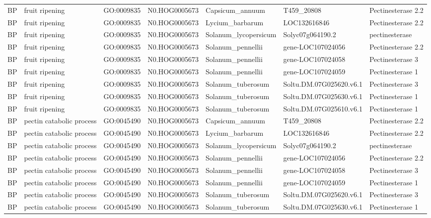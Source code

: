 \begin{table}
\begin{tabular}[t]{lllllll}
BP & fruit ripening & GO:0009835 & N0.HOG0005673 & Capsicum\_annuum & T459\_20808 & Pectinesterase 2.2\\
BP & fruit ripening & GO:0009835 & N0.HOG0005673 & Lycium\_barbarum & LOC132616846 & Pectinesterase 2.2\\
BP & fruit ripening & GO:0009835 & N0.HOG0005673 & Solanum\_lycopersicum & Solyc07g064190.2 & pectinesterase\\
BP & fruit ripening & GO:0009835 & N0.HOG0005673 & Solanum\_pennellii & gene-LOC107024056 & Pectinesterase 2.2\\
BP & fruit ripening & GO:0009835 & N0.HOG0005673 & Solanum\_pennellii & gene-LOC107024058 & Pectinesterase 3\\
BP & fruit ripening & GO:0009835 & N0.HOG0005673 & Solanum\_pennellii & gene-LOC107024059 & Pectinesterase 1\\
BP & fruit ripening & GO:0009835 & N0.HOG0005673 & Solanum\_tuberosum & Soltu.DM.07G025620.v6.1 & Pectinesterase 3\\
BP & fruit ripening & GO:0009835 & N0.HOG0005673 & Solanum\_tuberosum & Soltu.DM.07G025630.v6.1 & Pectinesterase 1\\
BP & fruit ripening & GO:0009835 & N0.HOG0005673 & Solanum\_tuberosum & Soltu.DM.07G025610.v6.1 & Pectinesterase 1\\
BP & pectin catabolic process & GO:0045490 & N0.HOG0005673 & Capsicum\_annuum & T459\_20808 & Pectinesterase 2.2\\
BP & pectin catabolic process & GO:0045490 & N0.HOG0005673 & Lycium\_barbarum & LOC132616846 & Pectinesterase 2.2\\
BP & pectin catabolic process & GO:0045490 & N0.HOG0005673 & Solanum\_lycopersicum & Solyc07g064190.2 & pectinesterase\\
BP & pectin catabolic process & GO:0045490 & N0.HOG0005673 & Solanum\_pennellii & gene-LOC107024056 & Pectinesterase 2.2\\
BP & pectin catabolic process & GO:0045490 & N0.HOG0005673 & Solanum\_pennellii & gene-LOC107024058 & Pectinesterase 3\\
BP & pectin catabolic process & GO:0045490 & N0.HOG0005673 & Solanum\_pennellii & gene-LOC107024059 & Pectinesterase 1\\
BP & pectin catabolic process & GO:0045490 & N0.HOG0005673 & Solanum\_tuberosum & Soltu.DM.07G025620.v6.1 & Pectinesterase 3\\
BP & pectin catabolic process & GO:0045490 & N0.HOG0005673 & Solanum\_tuberosum & Soltu.DM.07G025630.v6.1 & Pectinesterase 1\\

\end{tabular}
\end{table}
